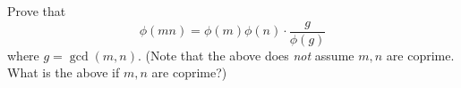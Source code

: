   Prove that
  \[
  \phi(mn) = \phi(m)\phi(n) \cdot \frac{g}{\phi(g)}
  \]
  where $g = \gcd(m,n)$.
  (Note that the above does \textit{not} assume $m,n$ are coprime.
  What is the above if $m,n$ are coprime?)

\BEGINCOMMENT
\ENDCOMMENT
